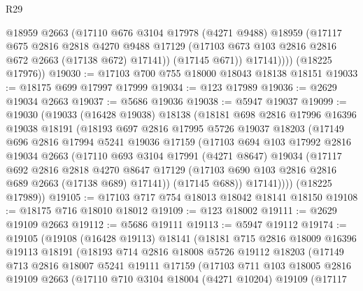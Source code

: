 \begin{lexlean}{R29}
\begin{coremodule}
              @18959
              @2663
              (@17110
                @676
                @3104
                @17978
                (@4271 @9488)
                @18959
                (@17117
                  @675
                  @2816
                  @2818
                  @4270
                  @9488
                  @17129
                  (@17103 @673 @103 @2816 @2816 @672 @2663 (@17138 @672) @17141))
                (@17145 @671))
              @17141))))
      (@18225 @17976))
@19030 := @17103 @700 @755 @18000 @18043 @18138 @18151
@19033 := @18175 @699 @17997 @17999
@19034 := @123 @17989
@19036 := @2629 @19034 @2663
@19037 := @5686 @19036
@19038 := @5947 @19037
@19099 := @19030
    (@19033
      (@16428 @19038)
      @18138
      (@18181
        @698
        @2816
        @17996
        @16396
        @19038
        @18191
        (@18193
          @697
          @2816
          @17995
          @5726
          @19037
          @18203
          (@17149
            @696
            @2816
            @17994
            @5241
            @19036
            @17159
            (@17103
              @694
              @103
              @17992
              @2816
              @19034
              @2663
              (@17110
                @693
                @3104
                @17991
                (@4271 @8647)
                @19034
                (@17117
                  @692
                  @2816
                  @2818
                  @4270
                  @8647
                  @17129
                  (@17103 @690 @103 @2816 @2816 @689 @2663 (@17138 @689) @17141))
                (@17145 @688))
              @17141))))
      (@18225 @17989))
@19105 := @17103 @717 @754 @18013 @18042 @18141 @18150
@19108 := @18175 @716 @18010 @18012
@19109 := @123 @18002
@19111 := @2629 @19109 @2663
@19112 := @5686 @19111
@19113 := @5947 @19112
@19174 := @19105
    (@19108
      (@16428 @19113)
      @18141
      (@18181
        @715
        @2816
        @18009
        @16396
        @19113
        @18191
        (@18193
          @714
          @2816
          @18008
          @5726
          @19112
          @18203
          (@17149
            @713
            @2816
            @18007
            @5241
            @19111
            @17159
            (@17103
              @711
              @103
              @18005
              @2816
              @19109
              @2663
              (@17110
                @710
                @3104
                @18004
                (@4271 @10204)
                @19109
                (@17117

\end{coremodule}
\end{lexlean}
